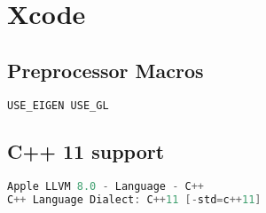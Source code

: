 
\section{Xcode}
\subsection{Preprocessor Macros}
\begin{lstlisting}[language = c++]
USE_EIGEN USE_GL
\end{lstlisting}

\subsection{C++ 11 support}
\begin{lstlisting}[language=C++]
Apple LLVM 8.0 - Language - C++
C++ Language Dialect: C++11 [-std=c++11]
\end{lstlisting}